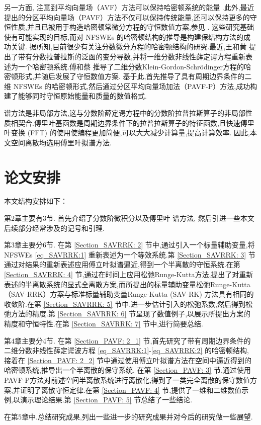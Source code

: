 另一方面,
注意到平均向量场（AVF）方法可以保持哈密顿系统的能量 \cite{buddGeometricIntegrationUsing1999,quispelNewClassEnergypreserving2008}.此外,最近提出的分区平均向量场（PAVF）方法不仅可以保持传统能量,还可以保持更多的守恒性质,并且已被用于构造哈密顿常微分方程的守恒数值方案,参见 \cite{caiPartitionedAveragedVector2018}.
这些研究基础使有可能实现的目标,而对 NFSWEs 的哈密顿结构的推导是构建保结构方法的成功关键.
据所知,目前很少有关注分数微分方程的哈密顿结构的研究.最近,王和黄 \cite{wangStructurepreservingNumericalMethods2018} 提出了带有分数拉普拉斯的泛函的变分导数,并将一维分数非线性薛定谔方程重新表述为一个哈密顿系统.傅和蔡 \cite{fuStructurepreservingAlgorithmsTwodimensional2020} 推导了二维分数Klein-Gordon-Schr{\"o}dinger方程的哈密顿形式,并随后发展了守恒数值方案.
基于此,首先推导了具有周期边界条件的二维 NFSWEs 的哈密顿形式,然后通过分区平均向量场加法（PAVF-P）方法,成功构建了能够同时守恒原始能量和质量的数值格式.

谱方法是非局部方法,这与分数阶薛定谔方程中的分数阶拉普拉斯算子的非局部性质相契合.傅里叶基函数是周期边界条件下的拉普拉斯算子的特征函数,且快速傅里叶变换 (FFT) 的使用使编程更加简便,可以大大减少计算量,提高计算效率.
因此,本文空间离散均选用傅里叶拟谱方法.

\section{论文安排}
本文结构安排如下：

第2章主要有3节. 首先介绍了分数阶微积分以及傅里叶 谱方法, 
然后引进一些本文后续部分经常涉及的记号和引理.

第3章主要分6节. 在第 \ref{Section_SAVRRK: 2} 节中,通过引入一个标量辅助变量,将NFSWEs \eqref{eq_SAVRRK:1} 重新表述为一个等效系统.第 \ref{Section_SAVRRK: 3} 节通过对结果的重新表述应用傅立叶拟谱逼近,得到一个半离散的守恒系统.在第 \ref{Section_SAVRRK: 4} 节,通过在时间上应用松弛Runge-Kutta方法,提出了对重新表述的半离散系统的显式全离散方案,而所提出的标量辅助变量松弛Runge-Kutta（SAV-RRK）方案与标准标量辅助变量Runge-Kutta (SAV-RK) 方法具有相同的收敛阶.在第 \ref{Section_SAVRRK: 5} 节中,进一步估计引入的松弛系数,然后得到松弛方法的精度.第 \ref{Section_SAVRRK: 6} 节呈现了数值例子,以展示所提出方案的精度和守恒特性.在第 \ref{Section_SAVRRK: 7} 节中,进行简要总结.


第4章主要分4节. 在第 \ref{Section_PAVF: 2_1} 节,首先研究了带有周期边界条件的二维分数非线性薛定谔波方程 \eqref{eq_SAVRRK:1}-\eqref{eq_SAVRRK:2} 的哈密顿结构, 接着在 \ref{Section_PAVF: 2_2} 节中通过使用傅立叶拟谱方法在空间中逼近得到的哈密顿系统,推导出一个半离散的保守系统.
在第 \ref{Section_PAVF: 3} 节,通过使用PAVF-P方法对前述空间半离散系统进行离散化,得到了一类完全离散的保守数值方案,并证明了离散守恒定律.在第 \ref{Section_PAVF: 4} 节,提供了一维和二维数值示例,以演示理论结果.第 \ref{Section_PAVF: 5} 节总结了一些结论.

在第5章中.总结研究成果,列出一些进一步的研究成果并对今后的研究做一些展望.